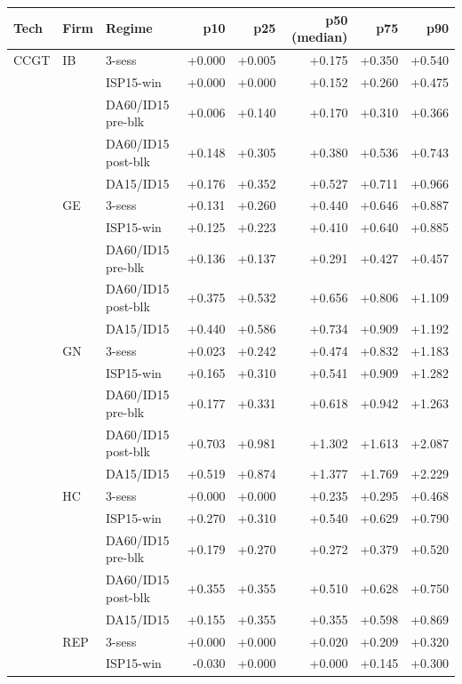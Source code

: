 \begin{tabular}{l l l r r r r r}
\toprule
Tech & Firm & Regime & p10 & p25 & p50 (median) & p75 & p90 \\
\midrule
CCGT & IB & 3-sess & +0.000 & +0.005 & +0.175 & +0.350 & +0.540 \\
 &  & ISP15-win & +0.000 & +0.000 & +0.152 & +0.260 & +0.475 \\
 &  & DA60/ID15 pre-blk & +0.006 & +0.140 & +0.170 & +0.310 & +0.366 \\
 &  & DA60/ID15 post-blk & +0.148 & +0.305 & +0.380 & +0.536 & +0.743 \\
 &  & DA15/ID15 & +0.176 & +0.352 & +0.527 & +0.711 & +0.966 \\
 & GE & 3-sess & +0.131 & +0.260 & +0.440 & +0.646 & +0.887 \\
 &  & ISP15-win & +0.125 & +0.223 & +0.410 & +0.640 & +0.885 \\
 &  & DA60/ID15 pre-blk & +0.136 & +0.137 & +0.291 & +0.427 & +0.457 \\
 &  & DA60/ID15 post-blk & +0.375 & +0.532 & +0.656 & +0.806 & +1.109 \\
 &  & DA15/ID15 & +0.440 & +0.586 & +0.734 & +0.909 & +1.192 \\
 & GN & 3-sess & +0.023 & +0.242 & +0.474 & +0.832 & +1.183 \\
 &  & ISP15-win & +0.165 & +0.310 & +0.541 & +0.909 & +1.282 \\
 &  & DA60/ID15 pre-blk & +0.177 & +0.331 & +0.618 & +0.942 & +1.263 \\
 &  & DA60/ID15 post-blk & +0.703 & +0.981 & +1.302 & +1.613 & +2.087 \\
 &  & DA15/ID15 & +0.519 & +0.874 & +1.377 & +1.769 & +2.229 \\
 & HC & 3-sess & +0.000 & +0.000 & +0.235 & +0.295 & +0.468 \\
 &  & ISP15-win & +0.270 & +0.310 & +0.540 & +0.629 & +0.790 \\
 &  & DA60/ID15 pre-blk & +0.179 & +0.270 & +0.272 & +0.379 & +0.520 \\
 &  & DA60/ID15 post-blk & +0.355 & +0.355 & +0.510 & +0.628 & +0.750 \\
 &  & DA15/ID15 & +0.155 & +0.355 & +0.355 & +0.598 & +0.869 \\
 & REP & 3-sess & +0.000 & +0.000 & +0.020 & +0.209 & +0.320 \\
 &  & ISP15-win & -0.030 & +0.000 & +0.000 & +0.145 & +0.300 \\

\end{tabular}
